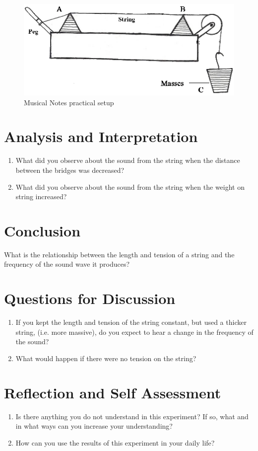 \begin{figure}[h!]
\centering
\includegraphics[width=14cm]{./img/musical-notes-1.png}
\caption{Musical Notes practical setup}
\label{fig:musical-notes-1}
\end{figure}

\section{Analysis and Interpretation}
\begin{enumerate}
\item What did you observe about the sound from the string when the distance between the bridges was decreased?
\item What did you observe about the sound from the string when the weight on string increased?
\end{enumerate}

\section{Conclusion}
What is the relationship between the length and tension of a string and the frequency of the sound wave it produces?

\section{Questions for Discussion}
\begin{enumerate}
\item If you kept the length and tension of the string constant, but used a thicker string, (i.e. more massive), do you expect to hear a change in the frequency of the sound?
\item What would happen if there were no tension on the string?
\end{enumerate}

\section{Reflection and Self Assessment}
\begin{enumerate}
\item Is there anything you do not understand in this experiment? If so, what and in what ways can you increase your understanding?
\item How can you use the results of this experiment in your daily life?
\end{enumerate}